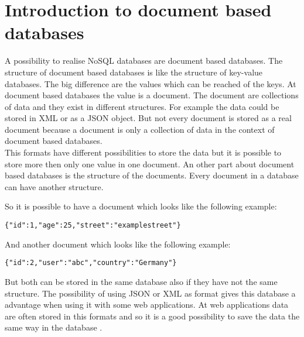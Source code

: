 \chapter{Introduction to document based databases}
A possibility to realise NoSQL databases are document based databases. The structure of document based databases is like the structure of key-value databases. The big difference are the values which can be reached of the keys. At document based databases the value is a document. The document are collections of data and they exist in different structures. For example the data could be stored in XML or as a JSON object. But not every document is stored as a real document because a document is only a collection of data in the context of document based databases. \\
This formats have different possibilities to store the data but it is possible to store more then only one value in one document. An other part about document based databases is the structure of the documents. Every document in a database can have another structure. 

So it is possible to have a document which looks like the following example:
\begin{lstlisting}[frame=single, caption=Example]
{"id":1,"age":25,"street":"examplestreet"}
\end{lstlisting}
And another document which looks like the following example: 
\begin{lstlisting}[frame=single, caption=Example of an other document]
{"id":2,"user":"abc","country":"Germany"}
\end{lstlisting}

%
But both can be stored in the same database also if they have not the same structure. 
The possibility of using JSON or XML as format gives this database a advantage when using it with some web applications. At web applications data are often stored in this formats and so it is a good possibility to save the data the same way in the database \cite{DocDBIntro1,DocDBIntro2,DocDBIntro3}.
